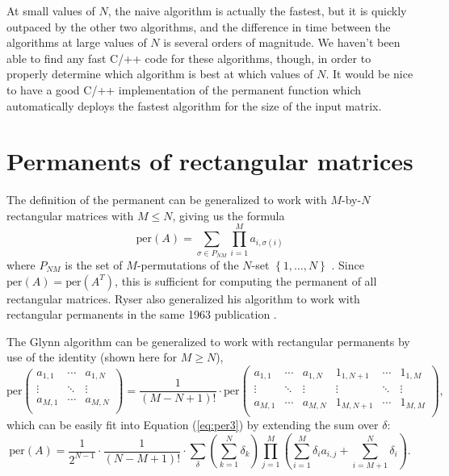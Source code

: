 \documentclass{article}
\begin{document}
At small values of $N$, the naive algorithm is actually the fastest, but it is quickly outpaced by
the other two algorithms, and the difference in time between the algorithms at large values of $N$
is several orders of magnitude. We haven't been able to find any fast C/++ code for these
algorithms, though, in order to properly determine which algorithm is best at which values of $N$.
It would be nice to have a good C/++ implementation of the permanent function which automatically
deploys the fastest algorithm for the size of the input matrix.

\section*{Permanents of rectangular matrices}

The definition of the permanent can be generalized to work with $M$-by-$N$ rectangular matrices with
$M \leq N$, giving us the formula
\begin{equation} \label{eq:rectper1}
    \text{per}(A) = \sum_{\sigma \in P_{NM}}{\prod_{i=1}^M{a_{i,{\sigma(i)}}}}
\end{equation}
where $P_{NM}$ is the set of $M$-permutations of the $N$-set $\left\{1,\dots,N\right\}$
\cite{wiki:permanent}.  Since $\text{per}(A) = \text{per}(A^T)$, this is sufficient for computing
the permanent of all rectangular matrices. Ryser also generalized his algorithm to work with
rectangular permanents in the same 1963 publication \cite{wiki:permanent,ryser1963}.

The Glynn algorithm can be generalized to work with rectangular permanents by use of the identity
(shown here for $M \geq N$),
\begin{equation} \label{eq:padidentity}
    {\text{per}}\left(
        \begin{matrix}
            a_{1,1} & \cdots & a_{1,N} \\
            \vdots & \ddots & \vdots \\
            a_{M,1} & \cdots & a_{M,N} \\
        \end{matrix}
    \right)
    = \frac{1}{\left(M - N + 1\right)!} \cdot {\text{per}}\left(
        \begin{matrix}
            a_{1,1} & \cdots & a_{1,N} & 1_{1,N+1} & \cdots & 1_{1,M} \\
            \vdots & \ddots & \vdots & \vdots & \ddots & \vdots \\
            a_{M,1} & \cdots & a_{M,N} & 1_{M,N+1} & \cdots & 1_{M,M} \\
        \end{matrix}
    \right),
\end{equation}
which can be easily fit into Equation (\ref{eq:per3}) by extending the sum over $\delta$:
\begin{equation} \label{eq:rectper3}
    \text{per}(A) = \frac{1}{2^{N-1}} \cdot \frac{1}{\left(N - M + 1\right)!} \cdot \sum_{\delta}{
        \left(\sum_{k=1}^N{\delta_k}\right)
        \prod_{j=1}^M{\left(\sum_{i=1}^M{\delta_i a_{i,j}} + \sum_{i=M+1}^N{\delta_i}\right)}
    }.
\end{equation}
\end{document}

